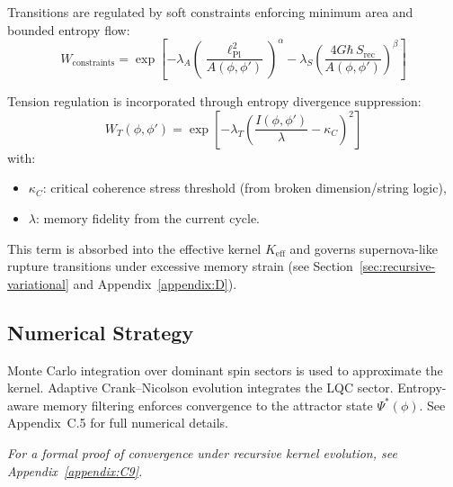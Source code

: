 Transitions are regulated by soft constraints enforcing minimum area and bounded entropy flow:
\[
W_{\text{constraints}} = \exp\left[
    -\lambda_A\left(\frac{\ell_{\text{Pl}}^2}{A(\phi,\phi')}\right)^{\alpha} 
    - \lambda_S\left(\frac{4G\hbar\, S_{\text{rec}}}{A(\phi,\phi')}\right)^{\beta}
\right]
\]

Tension regulation is incorporated through entropy divergence suppression:
\[
W_T(\phi,\phi') = \exp\left[
  -\lambda_T \left( \frac{I(\phi, \phi')}{\lambda} - \kappa_C \right)^2
\right]
\]
with:
\begin{itemize}
    \item \( \kappa_C \): critical coherence stress threshold (from broken dimension/string logic),
    \item \( \lambda \): memory fidelity from the current cycle.
\end{itemize}
This term is absorbed into the effective kernel \( K_{\text{eff}} \) and governs supernova-like rupture transitions under excessive memory strain (see Section~\ref{sec:recursive-variational} and Appendix~\ref{appendix:D}).

\subsection{Numerical Strategy}
\label{subsec:numerical}

Monte Carlo integration over dominant spin sectors is used to approximate the kernel. Adaptive Crank–Nicolson evolution integrates the LQC sector. Entropy-aware memory filtering enforces convergence to the attractor state \( \Psi^*(\phi) \). See Appendix~C.5 for full numerical details.

\vspace{0.5em}
\noindent
\textit{For a formal proof of convergence under recursive kernel evolution, see Appendix~\ref{appendix:C9}.}
